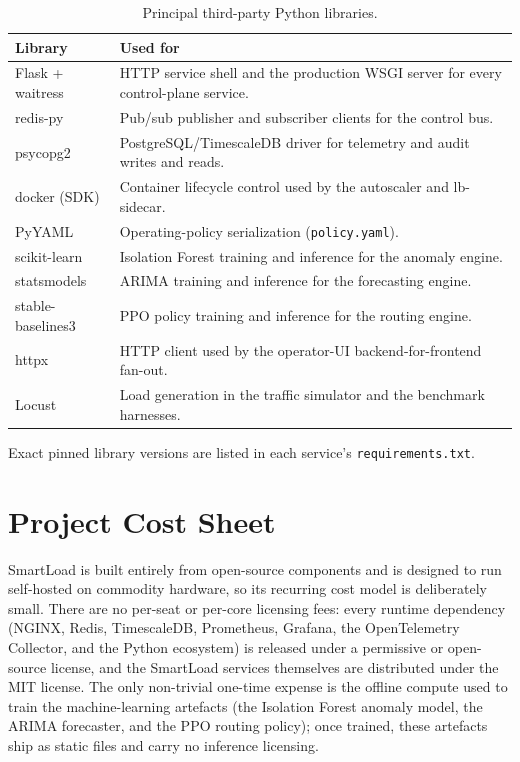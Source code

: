 \begin{table}[htbp]
  \centering
  \caption[Principal third-party Python libraries]{Principal third-party Python libraries.}
  \label{bm:tab-libs}
  \small
  \begin{tabularx}{\linewidth}{@{}l Y@{}}
    \toprule
    \textbf{Library} & \textbf{Used for} \\
    \midrule
    Flask + waitress    & HTTP service shell and the production WSGI server for every control-plane service. \\
    redis-py            & Pub/sub publisher and subscriber clients for the control bus. \\
    psycopg2            & PostgreSQL/TimescaleDB driver for telemetry and audit writes and reads. \\
    docker (SDK)        & Container lifecycle control used by the autoscaler and lb-sidecar. \\
    PyYAML              & Operating-policy serialization (\texttt{policy.yaml}). \\
    scikit-learn        & Isolation Forest training and inference for the anomaly engine. \\
    statsmodels         & ARIMA training and inference for the forecasting engine. \\
    stable-baselines3   & PPO policy training and inference for the routing engine. \\
    httpx               & HTTP client used by the operator-UI backend-for-frontend fan-out. \\
    Locust              & Load generation in the traffic simulator and the benchmark harnesses. \\
    \bottomrule
  \end{tabularx}
\end{table}

Exact pinned library versions are listed in each service's
\texttt{requirements.txt}.

\chapter{Project Cost Sheet}
\label{bm:app-cost}

SmartLoad is built entirely from open-source components and is designed to
run self-hosted on commodity hardware, so its recurring cost model is
deliberately small. There are no per-seat or per-core licensing fees: every
runtime dependency (NGINX, Redis, TimescaleDB, Prometheus, Grafana, the
OpenTelemetry Collector, and the Python ecosystem) is released under a
permissive or open-source license, and the SmartLoad services themselves are
distributed under the MIT license. The only non-trivial one-time expense is the
offline compute used to train the machine-learning artefacts (the Isolation
Forest anomaly model, the ARIMA forecaster, and the PPO routing policy); once
trained, these artefacts ship as static files and carry no inference licensing.

